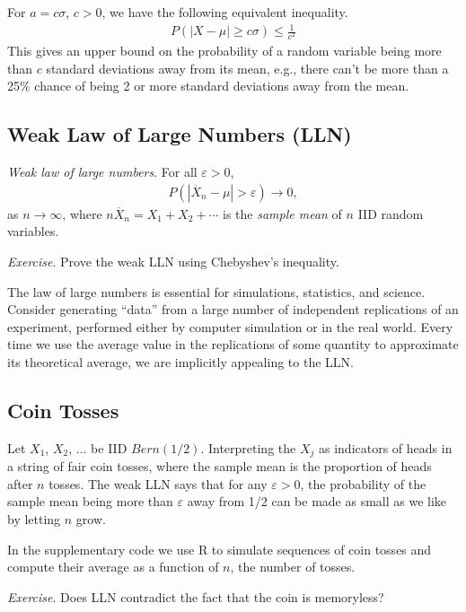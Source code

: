 For \(a = c\sigma\), \(c > 0\), 
we have the following equivalent inequality.
\begin{align}
P\left( |X - \mu| \geq c\sigma \right) \leq \frac{1}{c^{2}}
\end{align}
This gives an upper bound on the probability of a random variable being
more than \(c\) standard deviations away from its mean, 
e.g., there can't be more than a 25\% chance of being 2 or more standard deviations
away from the mean.

\subsection{Weak Law of Large Numbers (LLN)}

\emph{Weak law of large numbers}. 
For all \(\varepsilon > 0\),
\begin{align}
P\left( \left| {\overline{X}}_{n} - \mu \right| > \varepsilon \right) \rightarrow 0,
\end{align}
as \(n \rightarrow \infty\), where
\({n\overline{X}}_{n} = X_{1} + X_{2} + \cdots\) is the \emph{sample
mean} of \(n\) IID random variables. 

\emph{Exercise}. 
Prove the weak LLN using Chebyshev's inequality.

The law of large numbers is essential for simulations, 
statistics, and science. 
Consider generating ``data'' from a large number of independent 
replications of an experiment, 
performed either by computer simulation
or in the real world. 
Every time we use the average value in the
replications of some quantity to approximate its theoretical average, 
we are implicitly appealing to the LLN.

\subsection{Coin Tosses}

Let \(X_{1}\), \(X_{2}\), ... be IID \(Bern(1/2)\). 
Interpreting the \(X_{j}\) as indicators of heads in a string of fair coin tosses,
where the sample mean is the proportion of heads after \(n\) tosses. 
The weak LLN says that for any \(\varepsilon > 0\), 
the probability of the
sample mean being more than \(\varepsilon\) away from 1/2 can be made as
small as we like by letting \(n\) grow.

In the supplementary code we use R to simulate sequences of coin tosses and compute 
their average as
a function of \(n\), the number of tosses.

\emph{Exercise}. Does LLN contradict the fact that the coin is memoryless?

